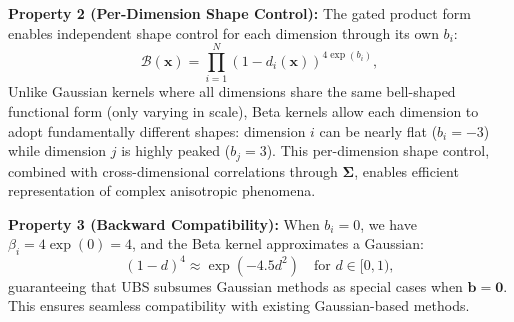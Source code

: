 \documentclass{article} %
\begin{document}
\textbf{Property 2 (Per-Dimension Shape Control):} The gated product form enables independent shape control for each dimension through its own $b_i$:
\begin{equation}
\mathcal{B}(\bm{x}) = \prod_{i=1}^N \left(1 - d_i(\bm{x})\right)^{4\exp(b_i)},
\end{equation}
Unlike Gaussian kernels where all dimensions share the same bell-shaped functional form (only varying in scale), Beta kernels allow each dimension to adopt fundamentally different shapes: dimension $i$ can be nearly flat ($b_i = -3$) while dimension $j$ is highly peaked ($b_j = 3$). This per-dimension shape control, combined with cross-dimensional correlations through $\bm{\Sigma}$, enables efficient representation of complex anisotropic phenomena.

\textbf{Property 3 (Backward Compatibility):} When $b_i = 0$, we have $\beta_i = 4\exp(0) = 4$, and the Beta kernel approximates a Gaussian:
\begin{equation}
(1-d)^{4} \approx \exp(-4.5d^2) \quad \text{for } d \in [0,1),
\end{equation}
guaranteeing that UBS subsumes Gaussian methods as special cases when $\bm{b} = \bm{0}$. This ensures seamless compatibility with existing Gaussian-based methods.
\end{document}
